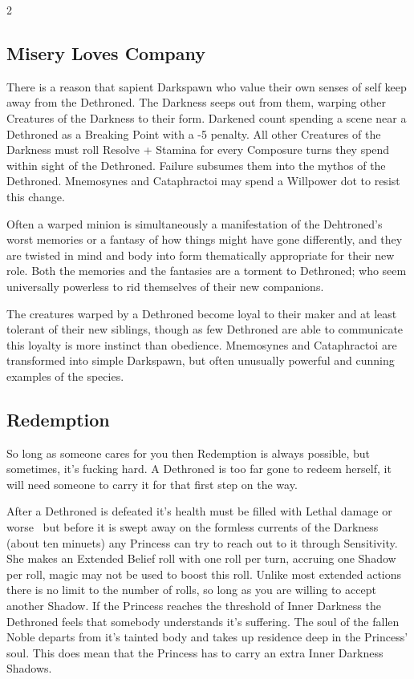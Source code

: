\begin{multicols}{2}
\subsection*{Misery Loves Company}

There is a reason that sapient Darkspawn who value their own senses of self keep away from the Dethroned. The Darkness seeps out from them, warping other Creatures of the Darkness to their form. Darkened count spending a scene near a Dethroned as a Breaking Point with a -5 penalty. All other Creatures of the Darkness must roll Resolve + Stamina for every Composure turns they spend within sight of the Dethroned. Failure subsumes them into the mythos of the Dethroned. Mnemosynes and Cataphractoi may spend a Willpower dot to resist this change. 

Often a warped minion is simultaneously a manifestation of the Dehtroned's worst memories or a fantasy of how things might have gone differently, and they are twisted in mind and body into form thematically appropriate for their new role. Both the memories and the fantasies are a torment to Dethroned; who seem universally powerless to rid themselves of their new companions. 

The creatures warped by a Dethroned become loyal to their maker and at least tolerant of their new siblings, though as few Dethroned are able to communicate this loyalty is more instinct than obedience. Mnemosynes and Cataphractoi are transformed into simple Darkspawn, but often unusually powerful and cunning examples of the species. 

\subsection*{Redemption}

So long as someone cares for you then Redemption is always possible, but sometimes, it's fucking hard. A Dethroned is too far gone to redeem herself, it will need someone to carry it for that first step on the way. 

After a Dethroned is defeated \textendash it's health must be filled with Lethal damage or worse \textendash\, but before it is swept away on the formless currents of the Darkness (about ten minuets) any Princess can try to reach out to it through Sensitivity. She makes an Extended Belief roll with one roll per turn, accruing one Shadow per roll, magic may not be used to boost this roll. Unlike most extended actions there is no limit to the number of rolls, so long as you are willing to accept another Shadow. If the Princess reaches the threshold of Inner Darkness the Dethroned feels that somebody understands it's suffering. The soul of the fallen Noble departs from it's tainted body and takes up residence deep in the Princess' soul. This does mean that the Princess has to carry an extra Inner Darkness Shadows. 


\end{multicols}

